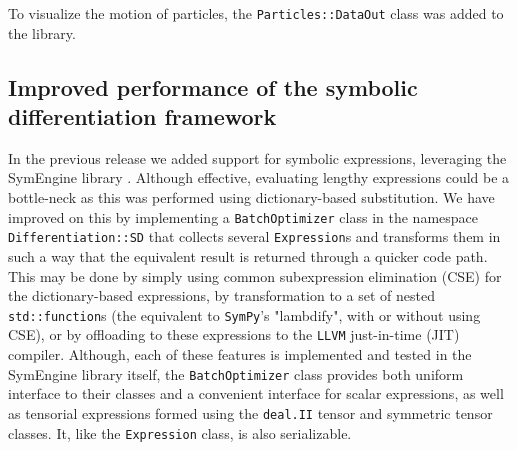 \documentclass{ansarticle-preprint}
\begin{document}
To visualize the motion of particles, the \texttt{Particles::DataOut} class was added to the library.






\subsection{Improved performance of the symbolic differentiation framework}
\label{subsec:symbdiff}

In the previous release we added support for symbolic expressions, leveraging the
SymEngine library \cite{symengine-web-page}.
Although effective, evaluating lengthy expressions could be a bottle-neck as this
was performed using dictionary-based substitution.
We have improved on this by implementing a \texttt{BatchOptimizer} class in the 
namespace \texttt{Differentiation::SD} that collects several \texttt{Expression}s
and transforms them in such a way that the equivalent result is returned through
a quicker code path.
This may be done by simply using common subexpression elimination (CSE) for the
dictionary-based expressions, by transformation to a set of nested 
\texttt{std::function}s (the equivalent to \texttt{SymPy}'s "lambdify", with or
without using CSE), or by offloading to these expressions to the \texttt{LLVM}
just-in-time (JIT) compiler.
Although, each of these features is implemented and tested in the SymEngine
library itself, the \texttt{BatchOptimizer} class provides both uniform
interface to their classes and a convenient interface for scalar expressions,
as well as tensorial expressions formed using the \texttt{deal.II} tensor and 
symmetric tensor classes.
It, like the \texttt{Expression} class, is also serializable.
\end{document}
